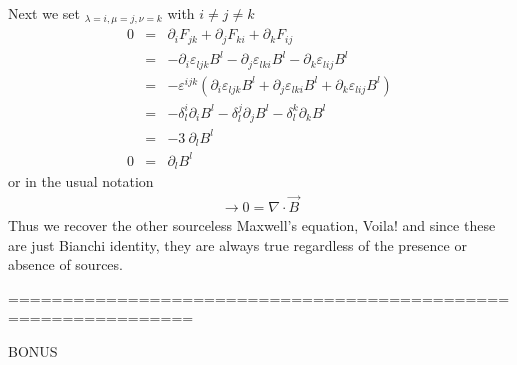 \documentclass[aps,preprint,preprintnumbers,nofootinbib,showpacs,prd]{revtex4-1}
\newcommand{\nbea}{\begin{eqnarray*}}
\newcommand{\neea}{\end{eqnarray*}}
\begin{document}
Next we set $_{\lambda = i, \mu = j, \nu = k}$ with $i \neq j \neq k$
%
\nbea
0 & = & \partial_i F_{jk} + \partial_j F_{k i} + \partial_k F_{i j} \\
& = & - \partial_i \varepsilon_{ljk} B^l- \partial_j \varepsilon_{lki} B^l - \partial_k \varepsilon_{lij} B^l \\
& = & - \varepsilon^{ijk} ( \partial_i \varepsilon_{ljk} B^l + \partial_j \varepsilon_{lki} B^l + \partial_k \varepsilon_{lij} B^l) \\
& = & -\delta^i_l \partial_i  B^l - \delta^j_l \partial_j  B^l - \delta^k_l \partial_k  B^l \\
& = & - 3~\partial_l B^l \\
0 & = & \partial_l B^l
\neea
%
or in the usual notation
%
\nbea
\rightarrow 0 = \nabla \cdot \vec B
\neea
Thus we recover the other sourceless Maxwell's equation, Voila! and since these are just Bianchi identity, they are always true regardless of the presence or absence of sources.

===============================================================

BONUS
\end{document}
